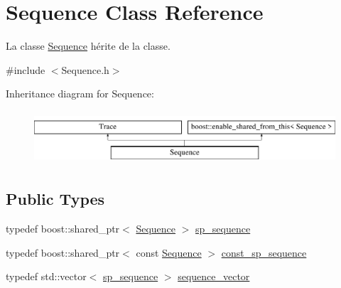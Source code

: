 \hypertarget{class_sequence}{}\section{Sequence Class Reference}
\label{class_sequence}


La classe \hyperlink{class_sequence}{Sequence} hérite de la classe.  




{\ttfamily \#include $<$Sequence.\+h$>$}

Inheritance diagram for Sequence\+:\begin{figure}[H]
\begin{center}
\leavevmode
\includegraphics[height=2.000000cm]{class_sequence}
\end{center}
\end{figure}
\subsection*{Public Types}
\begin{DoxyCompactItemize}
\item 
typedef boost\+::shared\+\_\+ptr$<$ \hyperlink{class_sequence}{Sequence} $>$ \hyperlink{class_sequence_a796bfa70aa4ddd4e447c210655b5dc5a}{sp\+\_\+sequence}
\item 
typedef boost\+::shared\+\_\+ptr$<$ const \hyperlink{class_sequence}{Sequence} $>$ \hyperlink{class_sequence_ad2a8856e4c26f405a86b0cb9683c25ed}{const\+\_\+sp\+\_\+sequence}
\item 
typedef std\+::vector$<$ \hyperlink{class_sequence_a796bfa70aa4ddd4e447c210655b5dc5a}{sp\+\_\+sequence} $>$ \hyperlink{class_sequence_a4487def8096371d361c6099c2d46dd13}{sequence\+\_\+vector}
\end{DoxyCompactItemize}
